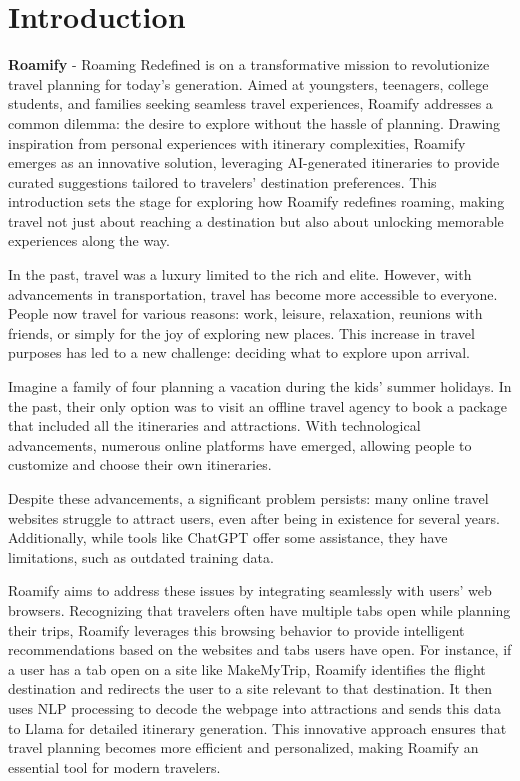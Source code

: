 \documentclass[conference]{IEEEtran}
\begin{document}
\IEEEpeerreviewmaketitle

\section{Introduction}

    \textbf{Roamify} - Roaming Redefined is on a transformative mission to revolutionize travel planning for today's generation. Aimed at youngsters, teenagers, college students, and families seeking seamless travel experiences, Roamify addresses a common dilemma: the desire to explore without the hassle of planning. Drawing inspiration from personal experiences with itinerary complexities, Roamify emerges as an innovative solution, leveraging AI-generated itineraries to provide curated suggestions tailored to travelers' destination preferences. This introduction sets the stage for exploring how Roamify redefines roaming, making travel not just about reaching a destination but also about unlocking memorable experiences along the way.

    In the past, travel was a luxury limited to the rich and elite. However, with advancements in transportation, travel has become more accessible to everyone. People now travel for various reasons: work, leisure, relaxation, reunions with friends, or simply for the joy of exploring new places. This increase in travel purposes has led to a new challenge: deciding what to explore upon arrival.

    Imagine a family of four planning a vacation during the kids' summer holidays. In the past, their only option was to visit an offline travel agency to book a package that included all the itineraries and attractions. With technological advancements, numerous online platforms have emerged, allowing people to customize and choose their own itineraries.

    Despite these advancements, a significant problem persists: many online travel websites struggle to attract users, even after being in existence for several years. Additionally, while tools like ChatGPT offer some assistance, they have limitations, such as outdated training data.

    Roamify aims to address these issues by integrating seamlessly with users' web browsers. Recognizing that travelers often have multiple tabs open while planning their trips, Roamify leverages this browsing behavior to provide intelligent recommendations based on the websites and tabs users have open. For instance, if a user has a tab open on a site like MakeMyTrip, Roamify identifies the flight destination and redirects the user to a site relevant to that destination. It then uses NLP processing to decode the webpage into attractions and sends this data to Llama for detailed itinerary generation. This innovative approach ensures that travel planning becomes more efficient and personalized, making Roamify an essential tool for modern travelers.
\end{document}
